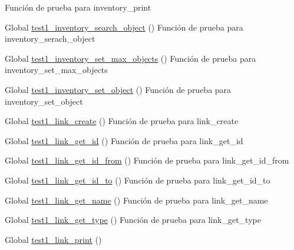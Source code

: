 \begin{DoxyRefList}
Función de prueba para inventory\+\_\+print  
\item[Global \mbox{\hyperlink{inventory__test_8c_a72641d8b12c0f08ec4aa3590517797e4}{test1\+\_\+inventory\+\_\+search\+\_\+object}} ()]\label{test__test000091}%
%
Función de prueba para inventory\+\_\+serach\+\_\+object  
\item[Global \mbox{\hyperlink{inventory__test_8c_aedc895d6409678b2176d822c105c3796}{test1\+\_\+inventory\+\_\+set\+\_\+max\+\_\+objects}} ()]\label{test__test000096}%
%
Función de prueba para inventory\+\_\+set\+\_\+max\+\_\+objects  
\item[Global \mbox{\hyperlink{inventory__test_8c_a68cdc4960d6ba206a27e71f82486ecd5}{test1\+\_\+inventory\+\_\+set\+\_\+object}} ()]\label{test__test000068}%
%
Función de prueba para inventory\+\_\+set\+\_\+object  
\item[Global \mbox{\hyperlink{link__test_8c_a82c5ee441ad22caad8272212a9e9cc26}{test1\+\_\+link\+\_\+create}} ()]\label{test__test000101}%
%
Función de prueba para link\+\_\+create  
\item[Global \mbox{\hyperlink{link__test_8c_a19c70f79fd51d123173f7aaf6ae50bf8}{test1\+\_\+link\+\_\+get\+\_\+id}} ()]\label{test__test000103}%
%
Función de prueba para link\+\_\+get\+\_\+id  
\item[Global \mbox{\hyperlink{link__test_8c_afa73dec9abb033137aa2df1a9b9a4871}{test1\+\_\+link\+\_\+get\+\_\+id\+\_\+from}} ()]\label{test__test000113}%
%
Función de prueba para link\+\_\+get\+\_\+id\+\_\+from  
\item[Global \mbox{\hyperlink{link__test_8c_ad22c05b585a7e1b67ba92f81796b5280}{test1\+\_\+link\+\_\+get\+\_\+id\+\_\+to}} ()]\label{test__test000118}%
%
Función de prueba para link\+\_\+get\+\_\+id\+\_\+to  
\item[Global \mbox{\hyperlink{link__test_8c_a044128db00a5cc385d7157dea8bdf3c3}{test1\+\_\+link\+\_\+get\+\_\+name}} ()]\label{test__test000108}%
%
Función de prueba para link\+\_\+get\+\_\+name  
\item[Global \mbox{\hyperlink{link__test_8c_a8217bf56aaf41d90bcadc4b4544d20d0}{test1\+\_\+link\+\_\+get\+\_\+type}} ()]\label{test__test000123}%
%
Función de prueba para link\+\_\+get\+\_\+type  
\item[Global \mbox{\hyperlink{link__test_8c_af99aa73f22b107610780db4877e34448}{test1\+\_\+link\+\_\+print}} ()]\label{test__test000127}%

\end{DoxyRefList}
